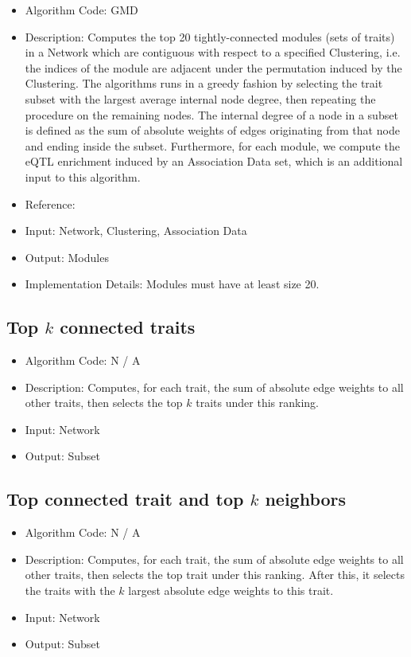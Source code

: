 \documentclass{article}
\begin{document}
\begin{itemize}
\item Algorithm Code: GMD
\item Description: Computes the top 20 tightly-connected modules (sets of traits) in a Network which are contiguous with respect to a specified Clustering, i.e. the indices of the module are adjacent under the permutation induced by the Clustering. The algorithms runs in a greedy fashion by selecting the trait subset with the largest average internal node degree, then repeating the procedure on the remaining nodes. The internal degree of a node in a subset is defined as the sum of absolute weights of edges originating from that node and ending inside the subset. Furthermore, for each module, we compute the eQTL enrichment induced by an Association Data set, which is an additional input to this algorithm.
\item Reference: \cite{ModuleAnalysis}
\item Input: Network, Clustering, Association Data
\item Output: Modules
\item Implementation Details: Modules must have at least size 20.
\end{itemize}

\subsection{Top $k$ connected traits}

\begin{itemize}
\item Algorithm Code: N / A
\item Description: Computes, for each trait, the sum of absolute edge weights to all other traits, then selects the top $k$ traits under this ranking.
\item Input: Network
\item Output: Subset
\end{itemize}

\subsection{Top connected trait and top $k$ neighbors}

\begin{itemize}
\item Algorithm Code: N / A
\item Description: Computes, for each trait, the sum of absolute edge weights to all other traits, then selects the top trait under this ranking. After this, it selects the traits with the $k$ largest absolute edge weights to this trait.
\item Input: Network
\item Output: Subset
\end{itemize}


\end{document}
